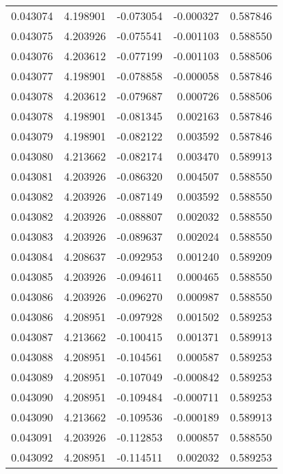 \begin{tabular}{lrrrr}
0.043074    &  4.198901 & -0.073054 & -0.000327 &             0.587846 \\
0.043075    &  4.203926 & -0.075541 & -0.001103 &             0.588550 \\
0.043076    &  4.203612 & -0.077199 & -0.001103 &             0.588506 \\
0.043077    &  4.198901 & -0.078858 & -0.000058 &             0.587846 \\
0.043078    &  4.203612 & -0.079687 &  0.000726 &             0.588506 \\
0.043078    &  4.198901 & -0.081345 &  0.002163 &             0.587846 \\
0.043079    &  4.198901 & -0.082122 &  0.003592 &             0.587846 \\
0.043080    &  4.213662 & -0.082174 &  0.003470 &             0.589913 \\
0.043081    &  4.203926 & -0.086320 &  0.004507 &             0.588550 \\
0.043082    &  4.203926 & -0.087149 &  0.003592 &             0.588550 \\
0.043082    &  4.203926 & -0.088807 &  0.002032 &             0.588550 \\
0.043083    &  4.203926 & -0.089637 &  0.002024 &             0.588550 \\
0.043084    &  4.208637 & -0.092953 &  0.001240 &             0.589209 \\
0.043085    &  4.203926 & -0.094611 &  0.000465 &             0.588550 \\
0.043086    &  4.203926 & -0.096270 &  0.000987 &             0.588550 \\
0.043086    &  4.208951 & -0.097928 &  0.001502 &             0.589253 \\
0.043087    &  4.213662 & -0.100415 &  0.001371 &             0.589913 \\
0.043088    &  4.208951 & -0.104561 &  0.000587 &             0.589253 \\
0.043089    &  4.208951 & -0.107049 & -0.000842 &             0.589253 \\
0.043090    &  4.208951 & -0.109484 & -0.000711 &             0.589253 \\
0.043090    &  4.213662 & -0.109536 & -0.000189 &             0.589913 \\
0.043091    &  4.203926 & -0.112853 &  0.000857 &             0.588550 \\
0.043092    &  4.208951 & -0.114511 &  0.002032 &             0.589253 \\

\end{tabular}
